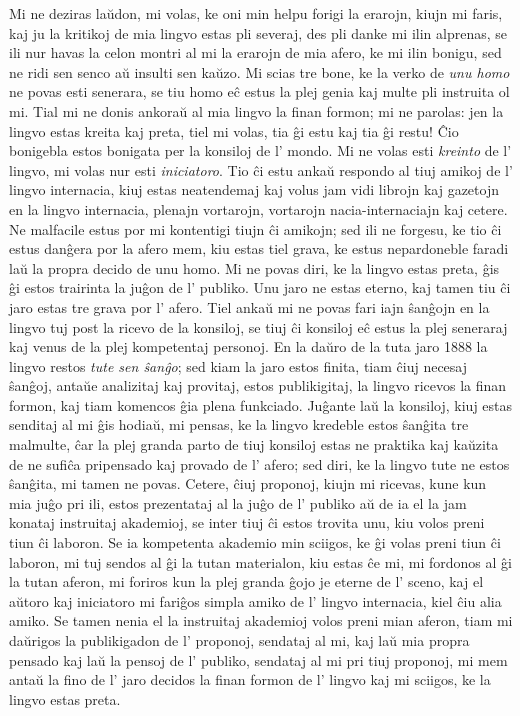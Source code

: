 Mi ne deziras laŭdon, mi volas, ke oni min helpu forigi la erarojn, kiujn mi faris, kaj ju la kritikoj de mia lingvo estas pli severaj, des pli danke mi ilin alprenas, se ili nur havas la celon montri al mi la erarojn de mia afero, ke mi ilin bonigu, sed ne ridi sen senco aŭ insulti sen kaŭzo. Mi scias tre bone, ke la verko de \emph{unu homo} ne povas esti senerara, se tiu homo eĉ estus la plej genia kaj multe pli instruita ol mi. Tial mi ne donis ankoraŭ al mia lingvo la finan formon; mi ne parolas: \glqq{}jen la lingvo estas kreita kaj preta, tiel mi volas, tia ĝi estu kaj tia ĝi restu!\grqq{} Ĉio bonigebla estos bonigata per la konsiloj de l' mondo. Mi ne volas esti \emph{kreinto} de l' lingvo, mi volas nur esti \emph{iniciatoro}. Tio ĉi estu ankaŭ respondo al tiuj amikoj de l' lingvo internacia, kiuj estas neatendemaj kaj volus jam vidi librojn kaj gazetojn en la lingvo internacia, plenajn vortarojn, vortarojn nacia-internaciajn kaj cetere. Ne malfacile estus por mi kontentigi tiujn ĉi amikojn; sed ili ne forgesu, ke tio ĉi estus danĝera por la afero mem, kiu estas tiel grava, ke estus nepardoneble faradi laŭ la propra decido de unu homo. Mi ne povas diri, ke la lingvo estas preta, ĝis ĝi estos trairinta la juĝon de l' publiko. Unu jaro ne estas eterno, kaj tamen tiu ĉi jaro estas tre grava por l' afero. Tiel ankaŭ mi ne povas fari iajn ŝanĝojn en la lingvo tuj post la ricevo de la konsiloj, se tiuj ĉi konsiloj eĉ estus la plej seneraraj kaj venus de la plej kompetentaj personoj. En la daŭro de la tuta jaro 1888 la lingvo restos \emph{tute sen ŝanĝo}; sed kiam la jaro estos finita, tiam ĉiuj necesaj ŝanĝoj, antaŭe analizitaj kaj provitaj, estos publikigitaj, la lingvo ricevos la finan formon, kaj tiam komencos ĝia plena funkciado. Juĝante laŭ la konsiloj, kiuj estas senditaj al mi ĝis hodiaŭ, mi pensas, ke la lingvo kredeble estos ŝanĝita tre malmulte, ĉar la plej granda parto de tiuj konsiloj estas ne praktika kaj kaŭzita de ne sufiĉa pripensado kaj provado de l' afero; sed diri, ke la lingvo tute ne estos ŝanĝita, mi tamen ne povas. Cetere, ĉiuj proponoj, kiujn mi ricevas, kune kun mia juĝo pri ili, estos prezentataj al la juĝo de l' publiko aŭ de ia el la jam konataj instruitaj akademioj, se inter tiuj ĉi estos trovita unu, kiu volos preni tiun ĉi laboron. Se ia kompetenta akademio min sciigos, ke ĝi volas preni tiun ĉi laboron, mi tuj sendos al ĝi la tutan materialon, kiu estas ĉe mi, mi fordonos al ĝi la tutan aferon, mi foriros kun la plej granda ĝojo je eterne de l' sceno, kaj el aŭtoro kaj iniciatoro mi fariĝos simpla amiko de l' lingvo internacia, kiel ĉiu alia amiko. Se tamen nenia el la instruitaj akademioj volos preni mian aferon, tiam mi daŭrigos la publikigadon de l' proponoj, sendataj al mi, kaj laŭ mia propra pensado kaj laŭ la pensoj de l' publiko, sendataj al mi pri tiuj proponoj, mi mem antaŭ la fino de l' jaro decidos la finan formon de l' lingvo kaj mi sciigos, ke la lingvo estas preta. 


